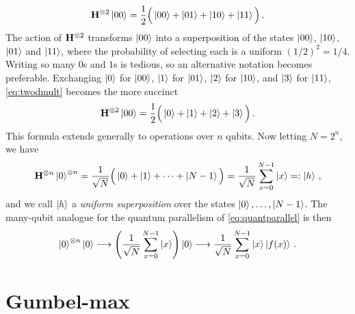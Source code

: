 \documentclass[12pt]{article} %
\begin{document}
\begin{align}\label{eq:twodmult}
	\mathbf{H}^{\otimes2} \ket{00} = \frac{1}{2}\Big(\ket{00} + \ket{01} + \ket{10} + \ket{11}\Big) \, .
\end{align}
The action of $\mathbf{H}^{\otimes2}$ transforms $\ket{00}$ into a superposition of the states $\ket{00}$, $\ket{10}$, $\ket{01}$ and $\ket{11}$, where the probability of selecting each is a uniform $(1/2)^2=1/4$. Writing so many $0$s and $1$s is tedious, so an alternative notation becomes preferable. Exchanging $\ket{0}$ for $\ket{00}$, $\ket{1}$ for $\ket{01}$, $\ket{2}$ for $\ket{10}$, and $\ket{3}$ for $\ket{11}$, \eqref{eq:twodmult} becomes the more succinct
\begin{align*}
	\mathbf{H}^{\otimes2} \ket{00} = \frac{1}{2}\Big(\ket{0} + \ket{1} + \ket{2} + \ket{3}\Big) \, .
\end{align*}
This formula extends generally to operations over $n$ qubits.  Now letting $N=2^n$, we have
\begin{align*}%
	\H^{\otimes n} \ket{0}^{\otimes n} = \frac{1}{\sqrt{N}}\Big(\ket{0} + \ket{1} + \dots + \ket{N-1}\Big) =  \frac{1}{\sqrt{N}} \sum_{x=0}^{N-1} \ket{x}=:\ket{h} \, ,
\end{align*}
and we call $\ket{h}$ a \emph{uniform superposition} over the states $\ket{0},\dots,\ket{N-1}$. The many-qubit analogue for the quantum parallelism of \eqref{eq:quantparallel} is then
\begin{align*}%
	\ket{0}^{\otimes n}\ket{0} \longrightarrow \left(\frac{1}{\sqrt{N}} \sum_{x=0}^{N-1} \ket{x} \right) \ket{0}  \longrightarrow \frac{1}{\sqrt{N}} \sum_{x=0}^{N-1} \ket{x} \ket{f(x)} \, .
\end{align*}


\section{Gumbel-max}\label{sec:gm}
\end{document}
